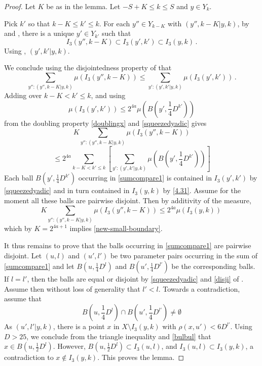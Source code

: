 \begin{proof}
\leanok
Let $K$ be as in the lemma. Let $-S+K\le k\le S$ and $y\in Y_k$.

Pick $k'$ so that $k-K\le k'\le k$.
For each $y''\in Y_{k-K}$ with $(y'',k-K| y,k)$,
by  and , there is a unique $y'\in Y_{k'}$ such that
\begin{equation}\label{4.31}
    I_3(y'',k-K)\subset I_3(y',k')\subset I_3(y,k)\, .
\end{equation}
Using , $(y',k'|y,k)$.

We conclude using the disjointedness property of
 that
\begin{equation}\label{scalecompare}
    \sum_{y'': (y'',k-K|y,k)}\mu(I_3(y'',k-K))
   \le
\sum_{y': (y',k'|y,k)}
\mu(I_3(y',k')) \, .
   \end{equation}
Adding over $k-K<k'\le k$, and using
\[\mu(I_3(y',k'))\le 2^{4a} \mu(B(y', \frac 14 D^{k'}))\]
from the doubling property \eqref{doublingx} and
\eqref{squeezedyadic} gives
\begin{equation}\label{sumcompare}
    K\sum_{y'': (y'',k-K|y,k)}
    \mu(I_3(y'',k-K))
\end{equation}
\begin{equation}\label{sumcompare1}
    \le 2^{4a} \sum_{k-K<k'\le k}
   \left[ \sum_{y': (y',k'|y,k)}
\mu(B(y', \frac 14 D^{k'}))\right]
\end{equation}
Each ball $B(y', \frac 14 D^{k'})$ occurring in
\eqref{sumcompare1} is contained in $I_3(y',k')$
by \eqref{squeezedyadic} and in turn contained in
$I_3(y,k)$ by \eqref{4.31}. Assume for the moment all these balls are pairwise disjoint. Then
by additivity of the measure,
\begin{equation}
    K\sum_{y'': (y'',k-K|y,k)}
    \mu(I_3(y'',k-K))
    \le 2^{4a}
\mu(I_3(y,k))\,
\end{equation}
which by $K=2^{4a+1}$ implies \eqref{new-small-boundary}.

It thus remains to prove that the balls
occurring in
\eqref{sumcompare1} are pairwise disjoint.
Let $(u,l)$ and $(u',l')$ be two parameter pairs occurring
in the sum of \eqref{sumcompare1} and let
$ B(u, \frac 14 D^l)$ and $B({u'}, \frac 14 D^{l'})$
be the corresponding balls. If
$l=l'$, then the balls are equal or disjoint by
\eqref{squeezedyadic} and \eqref{disji} of . Assume then without loss of generality that $l'<l$. Towards a contradiction, assume that
\begin{equation}\label{bulbul}
    B(u, \frac 14 D^l)\cap B({u'}, \frac 14 D^{l'})\neq \emptyset
\end{equation}
As $(u',l'|y,k)$, there is a point $x$ in
$X\setminus I_3(y,k)$ with $\rho(x,u')<6D^{l'}$.
Using $D>25$, we conclude from the triangle inequality and \eqref{bulbul} that
$x\in B(u,\frac 12D^l)$. However, $B(u,\frac 12 D^l)\subset I_3(u,l)$,
and $I_3(u,l)\subset I_3(y,k)$, a contradiction to
$x\not\in I_3(y,k)$.
This proves the lemma.
\end{proof}

